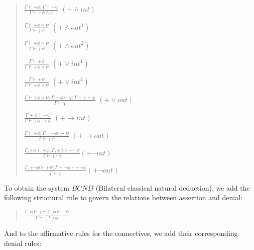 \documentclass[]{article}
\begin{document}
\begin{quote}
$\frac{\Gamma \vdash +\phi; \Gamma \vdash +\psi}{\Gamma \vdash +\phi\wedge\psi}$ $(+\wedge int)$ 

$\frac{\Gamma \vdash +\phi\wedge\psi}{\Gamma \vdash +\phi}$ $(+\wedge out^{1})$ 

$\frac{\Gamma \vdash +\phi\wedge\psi}{\Gamma \vdash +\psi}$ $(+\wedge out^{2})$

$\frac{\Gamma \vdash +\phi}{\Gamma \vdash +\phi\vee\psi}$ $(+\vee int^{1})$ 

$\frac{\Gamma \vdash +\psi}{\Gamma \vdash +\phi\vee\psi}$ $(+\vee int^{2})$ 

$\frac{\Gamma \vdash +\phi\vee\psi; \Gamma, +\phi \vdash \chi; \Gamma +\psi \vdash \chi}{\Gamma \vdash \chi}$ $(+\vee out)$

$\frac{\Gamma +\phi \vdash +\psi}{\Gamma \vdash +\phi\rightarrow\psi}$ $(+\rightarrow int)$

$\frac{\Gamma \vdash +\phi; \Gamma \vdash +\phi\rightarrow\psi}{\Gamma \vdash +\psi}$ $(+\rightarrow out)$

$\frac{\Gamma, +\phi \vdash +\psi; \Gamma, +\phi \vdash +\neg \psi}{\Gamma \vdash +\neg\phi} (+\neg int)$

$\frac{\Gamma, +\neg\phi \vdash +\psi; \Gamma +\neg\phi \vdash +\neg\psi}{\Gamma \vdash \phi} (+\neg out)$
\end{quote}

To obtain the system $BCND$ (Bilateral classical natural deduction), we add the following structural rule to govern the relations between assertion and denial:

\begin{quote}
$\frac{\Gamma, \phi \vdash +\psi; \Gamma, \phi \vdash -\psi}{\Gamma \vdash (*)\phi}$
\end{quote}

And to the affirmative rules for the connectives, we add their corresponding denial rules:
\end{document}
